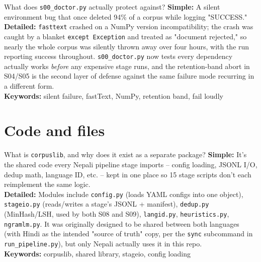 \documentclass[11pt]{report}
\begin{document}
\begin{qabox}{What does \texttt{s00\_doctor.py} actually protect against?}
\textbf{Simple:} A silent environment bug that once deleted 94\% of a
corpus while logging "SUCCESS."\\
\textbf{Detailed:} \texttt{fasttext} crashed on a NumPy version
incompatibility; the crash was caught by a blanket \texttt{except
Exception} and treated as "document rejected," so nearly the whole corpus
was silently thrown away over four hours, with the run reporting success
throughout. \texttt{s00\_doctor.py} now tests every dependency actually
works \textit{before} any expensive stage runs, and the retention-band
abort in S04/S05 is the second layer of defense against the same failure
mode recurring in a different form.\\
\textbf{Keywords:} silent failure, fastText, NumPy, retention band, fail loudly
\end{qabox}

\section{Code and files}

\begin{qabox}{What is \texttt{corpuslib}, and why does it exist as a
separate package?}
\textbf{Simple:} It's the shared code every Nepali pipeline stage
imports -- config loading, JSONL I/O, dedup math, language ID, etc. --
kept in one place so 15 stage scripts don't each reimplement the same
logic.\\
\textbf{Detailed:} Modules include \texttt{config.py} (loads YAML
configs into one object), \texttt{stageio.py} (reads/writes a stage's
JSONL + manifest), \texttt{dedup.py} (MinHash/LSH, used by both S08 and
S09), \texttt{langid.py}, \texttt{heuristics.py}, \texttt{ngramlm.py}. It
was originally designed to be shared between both languages (with Hindi
as the intended "source of truth" copy, per the \texttt{sync}
subcommand in \texttt{run\_pipeline.py}), but only Nepali actually uses
it in this repo.\\
\textbf{Keywords:} corpuslib, shared library, stageio, config loading
\end{qabox}
\end{document}
